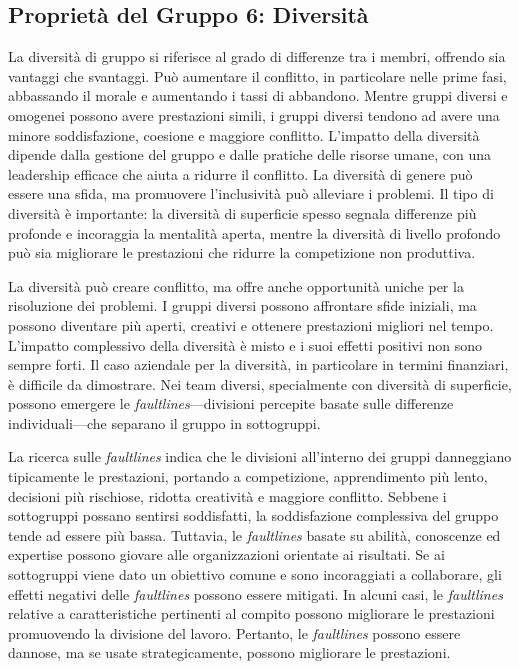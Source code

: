 \documentclass{article}
\begin{document}
\subsection{Proprietà del Gruppo 6: Diversità}
La diversità di gruppo si riferisce al grado di differenze tra i membri, offrendo sia vantaggi che svantaggi. Può aumentare il conflitto, in particolare nelle prime fasi, abbassando il morale e aumentando i tassi di abbandono. Mentre gruppi diversi e omogenei possono avere prestazioni simili, i gruppi diversi tendono ad avere una minore soddisfazione, coesione e maggiore conflitto. L'impatto della diversità dipende dalla gestione del gruppo e dalle pratiche delle risorse umane, con una leadership efficace che aiuta a ridurre il conflitto. La diversità di genere può essere una sfida, ma promuovere l'inclusività può alleviare i problemi. Il tipo di diversità è importante: la diversità di superficie spesso segnala differenze più profonde e incoraggia la mentalità aperta, mentre la diversità di livello profondo può sia migliorare le prestazioni che ridurre la competizione non produttiva.

La diversità può creare conflitto, ma offre anche opportunità uniche per la risoluzione dei problemi. I gruppi diversi possono affrontare sfide iniziali, ma possono diventare più aperti, creativi e ottenere prestazioni migliori nel tempo. L'impatto complessivo della diversità è misto e i suoi effetti positivi non sono sempre forti. Il caso aziendale per la diversità, in particolare in termini finanziari, è difficile da dimostrare. Nei team diversi, specialmente con diversità di superficie, possono emergere le \textit{faultlines}—divisioni percepite basate sulle differenze individuali—che separano il gruppo in sottogruppi.

La ricerca sulle \textit{faultlines} indica che le divisioni all'interno dei gruppi danneggiano tipicamente le prestazioni, portando a competizione, apprendimento più lento, decisioni più rischiose, ridotta creatività e maggiore conflitto. Sebbene i sottogruppi possano sentirsi soddisfatti, la soddisfazione complessiva del gruppo tende ad essere più bassa. Tuttavia, le \textit{faultlines} basate su abilità, conoscenze ed expertise possono giovare alle organizzazioni orientate ai risultati. Se ai sottogruppi viene dato un obiettivo comune e sono incoraggiati a collaborare, gli effetti negativi delle \textit{faultlines} possono essere mitigati. In alcuni casi, le \textit{faultlines} relative a caratteristiche pertinenti al compito possono migliorare le prestazioni promuovendo la divisione del lavoro. Pertanto, le \textit{faultlines} possono essere dannose, ma se usate strategicamente, possono migliorare le prestazioni.
\end{document}
